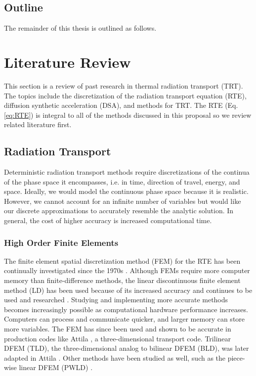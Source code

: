 \documentclass{article}
\begin{document}
\subsection{Outline}
\label{sec:OutlineIntro}

The remainder of this thesis is outlined as follows. 


\section{Literature Review}
\label{sec:LiteratureReview}

This section is a review of past research in thermal radiation transport (TRT). The topics include the discretization of the radiation transport equation (RTE), diffusion synthetic acceleration (DSA), and methods for TRT. The RTE (Eq. \ref{eq:RTE}) is integral to all of the methods discussed in this proposal so we review related literature first.

\subsection{Radiation Transport}

Deterministic radiation transport methods require discretizations of the continua of the phase space it encompasses, i.e. in time, direction of travel, energy, and space. Ideally, we would model the continuous phase space because it is realistic. However, we cannot account for an infinite number of variables but would like our discrete approximations to accurately resemble the analytic solution. In general, the cost of higher accuracy is increased computational time.

\subsubsection{High Order Finite Elements}

The finite element spatial discretization method (FEM) for the RTE has been continually investigated since the 1970s \cite{ReedTriangularMesh, LasaintFEM}. Although FEMs require more computer memory than finite-difference methods, the linear discontinuous finite element method (LD) has been used because of its increased accuracy \cite{LarsenAsymptotic} and continues to be used and researched \cite{LarsenConvergenceRates, HamiltonNegativeFluxFixups, Adams_Disc_FEM_Thick_Diff}. Studying and implementing more accurate methods becomes increasingly possible as computational hardware performance increases. Computers can process and communicate quicker, and larger memory can store more variables. The FEM has since been used and shown to be accurate in production codes like Attila \cite{WareingAttila}, a three-dimensional transport code. Trilinear DFEM (TLD), the three-dimensional analog to bilinear DFEM (BLD), was later adapted in Attila \cite{AttilaUsersManual}. Other methods have been studied as well, such as the piece-wise linear DFEM (PWLD) \cite{BaileyDFEMCylindrical}.
\end{document}
